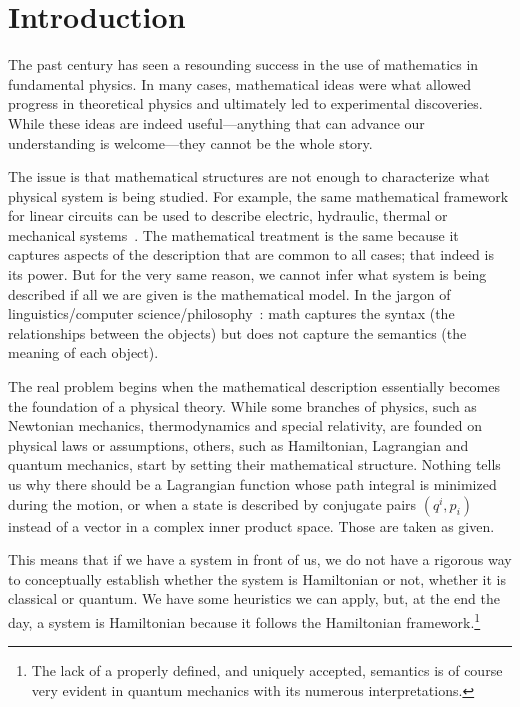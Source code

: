 \documentclass[smallextended]{svjour3}
\numberwithin{equation}{section}
\theoremstyle{definition}
\newcommand{\arxiv}[1]{\ifjournal\else#1\fi}
\begin{document}
\arxiv{\maketitle}

\section{Introduction}

The past century has seen a resounding success in the use of mathematics in fundamental physics. In many cases, mathematical ideas were what allowed progress in theoretical physics and ultimately led to experimental discoveries. While these ideas are indeed useful---anything that can advance our understanding is welcome---they cannot be the whole story.

The issue is that mathematical structures are not enough to characterize what physical system is being studied. For example, the same mathematical framework for linear circuits can be used to describe electric, hydraulic, thermal or mechanical systems~\cite{Roland,Barron,Borutzky}. The mathematical treatment is the same because it captures aspects of the description that are common to all cases; that indeed is its power. But for the very same reason, we cannot infer what system is being described if all we are given is the mathematical model. In the jargon of linguistics/computer science/philosophy~\cite{Freidin,Friedman}: math captures the syntax (the relationships between the objects) but does not capture the semantics (the meaning of each object).

The real problem begins when the mathematical description essentially becomes the foundation of a physical theory. While some branches of physics, such as Newtonian mechanics, thermodynamics and special relativity, are founded on physical laws or assumptions, others, such as Hamiltonian, Lagrangian and quantum mechanics, start by setting their mathematical structure. Nothing tells us why there should be  a Lagrangian function whose path integral is minimized during the motion, or when a state is described by conjugate pairs $(q^i, p_i)$ instead of a vector in a complex inner product space. Those are taken as given.

This means that if we have a system in front of us, we do not have a rigorous way to conceptually establish whether the system is Hamiltonian or not, whether it is classical or quantum. We have some heuristics we can apply, but, at the end the day, a system is Hamiltonian because it follows the Hamiltonian framework.\footnote{The lack of a properly defined, and uniquely accepted, semantics is of course very evident in quantum mechanics with its numerous interpretations.}
\end{document}
